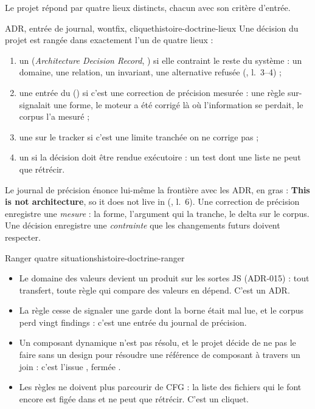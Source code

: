 Le projet répond par quatre lieux distincts, chacun avec son critère d'entrée.

\begin{definition}{ADR, entrée de journal, wontfix, cliquet}{histoire-doctrine-lieux}
Une décision du projet est rangée dans exactement l'un de quatre lieux :
\begin{enumerate}
  \item un  (\emph{Architecture Decision Record}, ) si elle contraint le reste du système : \og un domaine, une relation, un invariant, une alternative refusée\fg{} (, l.~3--4) ;
  \item une entrée du  () si c'est une correction de précision mesurée : une règle sur-signalait une forme, le moteur a été corrigé là où l'information se perdait, le corpus l'a mesuré ;
  \item une  sur le tracker si c'est une limite tranchée \og on ne corrige pas\fg{} ;
  \item un  si la décision doit être rendue exécutoire : un test dont une liste ne peut que rétrécir.
\end{enumerate}
\end{definition}

Le journal de précision énonce lui-même la frontière avec les ADR, en gras : \og \textbf{This is not architecture}, so it does not live in \fg{} (, l.~6). Une correction de précision enregistre une \emph{mesure} : la forme, l'argument qui la tranche, le delta sur le corpus. Une décision enregistre une \emph{contrainte} que les changements futurs doivent respecter.

\begin{exemple}{Ranger quatre situations}{histoire-doctrine-ranger}
\begin{itemize}
  \item Le domaine des valeurs devient un produit sur les sortes JS (ADR-015) : tout transfert, toute règle qui compare des valeurs en dépend. C'est un ADR.
  \item La règle  cesse de signaler une garde dont la borne était mal lue, et le corpus perd vingt findings : c'est une entrée du journal de précision.
  \item Un composant dynamique  n'est pas résolu, et le projet décide de ne pas le faire sans un design pour résoudre une référence de composant à travers un join : c'est l'issue , fermée .
  \item Les règles ne doivent plus parcourir de CFG : la liste des fichiers qui le font encore est figée dans  et ne peut que rétrécir. C'est un cliquet.
\end{itemize}
\end{exemple}

